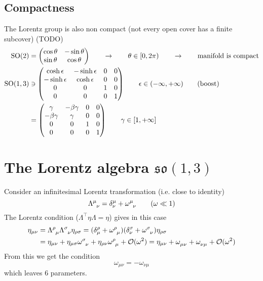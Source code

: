 \subsection{Compactness} The Lorentz group is also non compact (not every open cover has a finite subcover) (TODO)
\begin{align*}
\operatorname{SO}(2) &= \begin{pmatrix}
\cos\theta & - \sin\theta \\ \sin\theta & \cos\theta
\end{pmatrix} \qquad \to \qquad \theta \in [0,2\pi) \qquad \to \qquad \text{manifold is compact} \\
\operatorname{SO}(1,3) &\ni \begin{pmatrix}
\cosh\epsilon & -\sinh\epsilon & 0 & 0 \\
- \sinh\epsilon & \cosh\epsilon &0&0\\
0&0&1&0\\0&0&0&1
\end{pmatrix} \qquad \epsilon \in (-\infty, +\infty) \qquad \text{(boost)} \\
&= \begin{pmatrix}
\gamma & -\beta\gamma & 0 & 0 \\
- \beta\gamma & \gamma &0&0\\
0&0&1&0\\0&0&0&1
\end{pmatrix} \qquad \gamma \in [1, +\infty]
\end{align*}

\section[The Lorentz algebra so(1,3)]{The Lorentz algebra $\mathfrak{so}(1,3)$}
Consider an infinitesimal Lorentz transformation (i.e. close to identity)
\[ \tensor{\Lambda}{^\mu_{\nu}} = \delta^\mu_\nu + \tensor{\omega}{^\mu_{\nu}} \qquad (\omega \ll 1) \]
The Lorentz condition ($\Lambda^\intercal\eta\Lambda = \eta$) gives in this case
\begin{align*}
\eta_{\mu\nu}  &= \tensor{\Lambda}{^\rho_{\mu}}\tensor{\Lambda}{^\sigma_{\nu}}\eta_{\rho\sigma} = (\delta^\rho_\mu + \tensor{\omega}{^\rho_{\mu}})(\delta^\sigma_\nu + \tensor{\omega}{^\sigma_{\nu}})\eta_{\rho\sigma} \\
&= \eta_{\mu\nu} + \eta_{\mu\sigma}\tensor{\omega}{^\sigma_{\nu}} + \eta_{\rho\nu}\tensor{\omega}{^\rho_{\mu}} + \mathcal{O}(\omega^2) = \eta_{\mu\nu} + \tensor{\omega}{_\mu_{\nu}} + \tensor{\omega}{_\nu_{\mu}} + \mathcal{O}(\omega^2)
\end{align*}
From this we get the condition
\[ \omega_{\mu\nu} = - \omega_{\nu\mu} \]
which leaves 6 parameters.

